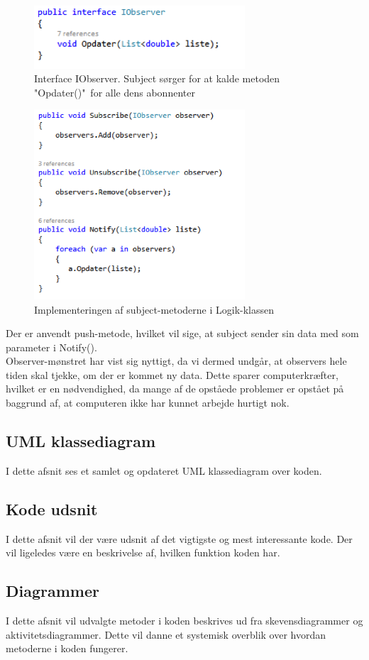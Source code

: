 \begin{figure}[H]
	\centering
	\includegraphics[width=0.7\textwidth]{Figurer/SoftwareImplementering/observer2}
	\caption{Interface IObserver. Subject sørger for at kalde metoden "Opdater()"\ for alle dens abonnenter}
	\label{observer2}
\end{figure}

\begin{figure}[H]
	\centering
	\includegraphics[width=0.7\textwidth]{Figurer/SoftwareImplementering/observer3}
	\caption{Implementeringen af subject-metoderne i Logik-klassen}
	\label{observer3}
\end{figure}
Der er anvendt push-metode, hvilket vil sige, at subject sender sin data med som parameter i Notify().\\
Observer-mønstret har vist sig nyttigt, da vi dermed undgår, at observers hele tiden skal tjekke, om der er kommet ny data. Dette sparer computerkræfter, hvilket er en nødvendighed, da mange af de opståede problemer er opstået på baggrund af, at computeren ikke har kunnet arbejde hurtigt nok.

\subsection{UML klassediagram}\label{UML klassediagram}
I dette afsnit ses et samlet og opdateret UML klassediagram over koden. 


\subsection{Kode udsnit}
I dette afsnit vil der være udsnit af det vigtigste og mest interessante kode. Der vil ligeledes være en beskrivelse af, hvilken funktion koden har.

\subsection{Diagrammer}
I dette afsnit vil udvalgte metoder i koden beskrives ud fra skevensdiagrammer og aktivitetsdiagrammer. Dette vil danne et systemisk overblik over hvordan metoderne i koden fungerer. 

 







